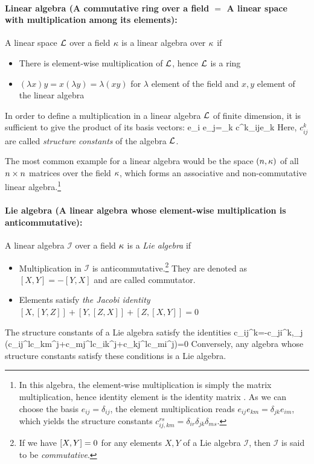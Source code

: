 \documentclass[12pt]{article}
\numberwithin{equation}{section}
\begin{document}
\paragraph{Linear algebra (A commutative ring over a field $=$ A linear space with multiplication among its elements):}A linear space $\mathcal{L}$ over a field $\kappa$ is a linear algebra over $\kappa$ if
	\begin{itemize}
		\item There is element-wise multiplication of $\mathcal{L}$, hence $\mathcal{L}$ is a ring
		\item $(\lambda x)y=x(\lambda y)=\lambda (xy)$ for $\lambda$ element of the field and $x,y$ element of the linear algebra
	\end{itemize}

In order to define a multiplication in a linear algebra $\mathcal{L}$ of finite dimension, it is sufficient to give the product of its basis vectors:
	\be 
	e_i e_j=\sum\limits_k c^k_{ij}e_k
	\ee 
Here, $c^k_{ij}$ are called \emph{structure constants} of the algebra $\mathcal{L}$.

The most common example for a linear algebra would be the space $\mathfrak(n,\kappa)$ of all $n\times n$ matrices over the field $\kappa$, which forms an associative and non-commutative linear algebra.\footnote{
In this algebra, the element-wise multiplication is simply the matrix multiplication, hence identity element is the identity matrix . As we can choose the basis $e_{ij}=\delta_{ij}$, the element multiplication reads $e_{ij}e_{km}=\delta_{jk}e_{im}$, which yields the structure constants $c^{rs}_{ij,km}=\delta_{ir}\delta_{jk}\delta_{ms}$.
}
	
	
\paragraph{Lie algebra (A linear algebra whose element-wise multiplication is anticommutative):}
A linear algebra $\mathcal{I}$ over a field $\kappa$ is a \emph{Lie algebra} if 
	\begin{itemize}
	\item Multiplication in $\mathcal{I}$ is anticommutative.\footnote{If we have $\comm{X}{Y}=0$ for any elements $X,Y$ of a Lie algebra $\mathcal{I}$, then $\mathcal{I}$ is said to be \emph{commutative}.} They are denoted as $[X,Y]=-[Y,X]$ and are called commutator.
	\item Elements satisfy \emph{the Jacobi identity} $[X,[Y,Z]]+[Y,[Z,X]]+[Z,[X,Y]]=0$
\end{itemize}
The structure constants of a Lie algebra satisfy the identities
	\be 
	c_{ij}^k=-c_{ji}^k\;,\quad \sum\limits_{j} \left(c_{ij}^lc_{km}^j+c_{mj}^lc_{ik}^j+c_{kj}^lc_{mi}^j\right)=0
	\ee 
	Conversely, any algebra whose structure constants satisfy these conditions is a Lie algebra.
	
\end{document}
